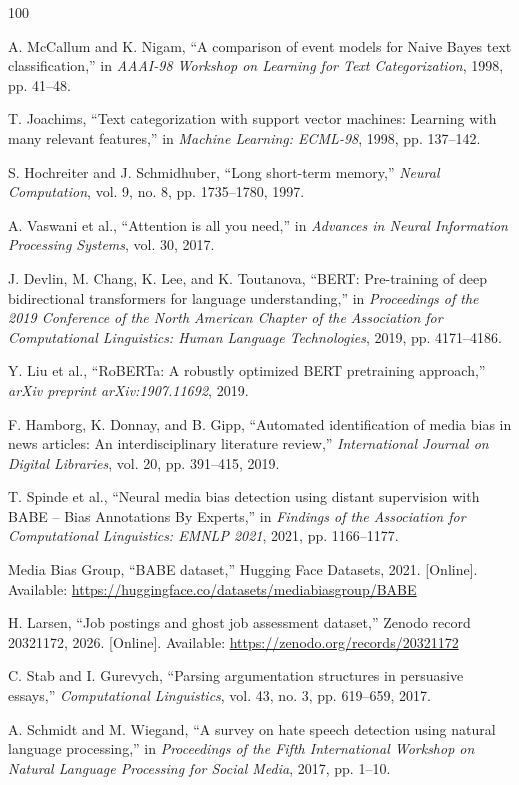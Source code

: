 \documentclass[a4paper,12pt]{report}
\begin{document}
\begin{thebibliography}{100}

 A. McCallum and K. Nigam, ``A comparison of event models for Naive Bayes text classification,'' in \textit{AAAI-98 Workshop on Learning for Text Categorization}, 1998, pp. 41--48.

 T. Joachims, ``Text categorization with support vector machines: Learning with many relevant features,'' in \textit{Machine Learning: ECML-98}, 1998, pp. 137--142.

 S. Hochreiter and J. Schmidhuber, ``Long short-term memory,'' \textit{Neural Computation}, vol. 9, no. 8, pp. 1735--1780, 1997.

 A. Vaswani et al., ``Attention is all you need,'' in \textit{Advances in Neural Information Processing Systems}, vol. 30, 2017.

 J. Devlin, M. Chang, K. Lee, and K. Toutanova, ``BERT: Pre-training of deep bidirectional transformers for language understanding,'' in \textit{Proceedings of the 2019 Conference of the North American Chapter of the Association for Computational Linguistics: Human Language Technologies}, 2019, pp. 4171--4186.

 Y. Liu et al., ``RoBERTa: A robustly optimized BERT pretraining approach,'' \textit{arXiv preprint arXiv:1907.11692}, 2019.

 F. Hamborg, K. Donnay, and B. Gipp, ``Automated identification of media bias in news articles: An interdisciplinary literature review,'' \textit{International Journal on Digital Libraries}, vol. 20, pp. 391--415, 2019.

 T. Spinde et al., ``Neural media bias detection using distant supervision with BABE -- Bias Annotations By Experts,'' in \textit{Findings of the Association for Computational Linguistics: EMNLP 2021}, 2021, pp. 1166--1177.

 Media Bias Group, ``BABE dataset,'' Hugging Face Datasets, 2021. [Online]. Available: \url{https://huggingface.co/datasets/mediabiasgroup/BABE}

 H. Larsen, ``Job postings and ghost job assessment dataset,'' Zenodo record 20321172, 2026. [Online]. Available: \url{https://zenodo.org/records/20321172}

 C. Stab and I. Gurevych, ``Parsing argumentation structures in persuasive essays,'' \textit{Computational Linguistics}, vol. 43, no. 3, pp. 619--659, 2017.

 A. Schmidt and M. Wiegand, ``A survey on hate speech detection using natural language processing,'' in \textit{Proceedings of the Fifth International Workshop on Natural Language Processing for Social Media}, 2017, pp. 1--10.

\end{thebibliography}
\end{document}
